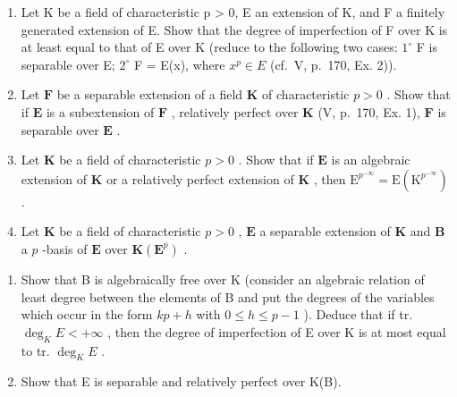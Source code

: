 \begin{enumerate}
\def\labelenumi{\arabic{enumi})}
\setcounter{enumi}{2}
\item
  Let K be a field of characteristic p \textgreater{} 0, E an extension of K, and F a finitely generated extension of E. Show that the degree of imperfection of F over K is at least equal to that of E over K (reduce to the following two cases: \(1^{\circ}\) F is separable over E; \(2^{\circ}\) F = E(x), where \(x^{p} \in E\) (cf.~V, p.~170, Ex. 2)).
\item
  Let \(\mathbf{F}\) be a separable extension of a field \(\mathbf{K}\) of characteristic \(p > 0\) . Show that if \(\mathbf{E}\) is a subextension of \(\mathbf{F}\) , relatively perfect over \(\mathbf{K}\) (V, p.~170, Ex. 1), \(\mathbf{F}\) is separable over \(\mathbf{E}\) .
\item
  Let \(\mathbf{K}\) be a field of characteristic \(p > 0\) . Show that if \(\mathbf{E}\) is an algebraic extension of \(\mathbf{K}\) or a relatively perfect extension of \(\mathbf{K}\) , then \(\mathrm{E}^{p^{-\infty}} = \mathrm{E}(\mathrm{K}^{p^{-\infty}})\) .
\item
  Let \(\mathbf{K}\) be a field of characteristic \(p > 0\) , \(\mathbf{E}\) a separable extension of \(\mathbf{K}\) and \(\mathbf{B}\) a \(p\) -basis of \(\mathbf{E}\) over \(\mathbf{K}(\mathbf{E}^p)\) .
\end{enumerate}

\begin{enumerate}
\def\labelenumi{\alph{enumi})}
\item
  Show that B is algebraically free over K (consider an algebraic relation of least degree between the elements of B and put the degrees of the variables which occur in the form \(kp + h\) with \(0 \leqslant h \leqslant p - 1\) ). Deduce that if tr. \(\deg_{K}E < +\infty\) , then the degree of imperfection of E over K is at most equal to tr. \(\deg_{K}E\) .
\item
  Show that E is separable and relatively perfect over K(B).
\end{enumerate}

